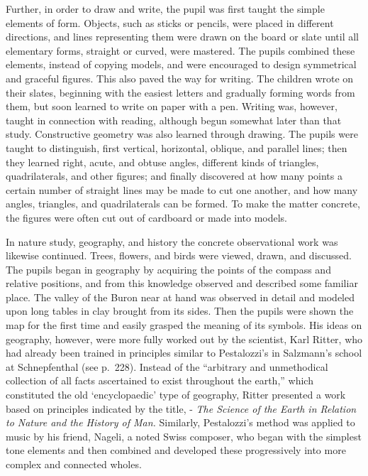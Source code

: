 \documentclass[]{book}
\begin{document}
Further, in order to draw and write, the pupil was first taught the simple elements of form. Objects, such as sticks or pencils, were placed in different directions, and lines representing them were drawn on the board or slate until all elementary forms, straight or curved, were mastered. The pupils combined these elements, instead of copying models, and were encouraged to design symmetrical and graceful figures. This also paved the way for writing. The children wrote on their slates, beginning with the easiest letters and gradually forming words from them, but soon learned to write on paper with a pen. Writing was, however, taught in connection with reading, although begun somewhat later than that study. Constructive geometry was also learned through drawing. The pupils were taught to distinguish, first vertical, horizontal, oblique, and parallel lines; then they learned right, acute, and obtuse angles, different kinds of triangles, quadrilaterals, and other figures; and finally discovered at how many points a certain number of straight lines may be made to cut one another, and how many angles, triangles, and quadrilaterals can be formed. To make the matter concrete, the figures were often cut out of cardboard or made into models.

In nature study, geography, and history the concrete observational work was likewise continued. Trees, flowers, and birds were viewed, drawn, and discussed. The pupils began in geography by acquiring the points of the compass and relative positions, and from this knowledge observed and described some familiar place. The valley of the Buron near at hand was observed in detail and modeled upon long tables in clay brought from its sides. Then the pupils were shown the map for the first time and easily grasped the meaning of its symbols. His ideas on geography, however, were more fully worked out by the scientist, Karl Ritter, who had already been trained in principles similar to Pestalozzi's in Salzmann's school at Schnepfenthal (see p.~228). Instead of the ``arbitrary and unmethodical collection of all facts ascertained to exist throughout the earth,'' which constituted the old `encyclopaedic' type of geography, Ritter presented a work based on principles indicated by the title, - \emph{The Science of the Earth in Relation to Nature and the History of Man.} Similarly, Pestalozzi's method was applied to music by his friend, Nageli, a noted Swiss composer, who began with the simplest tone elements and then combined and developed these progressively into more complex and connected wholes.
\end{document}
